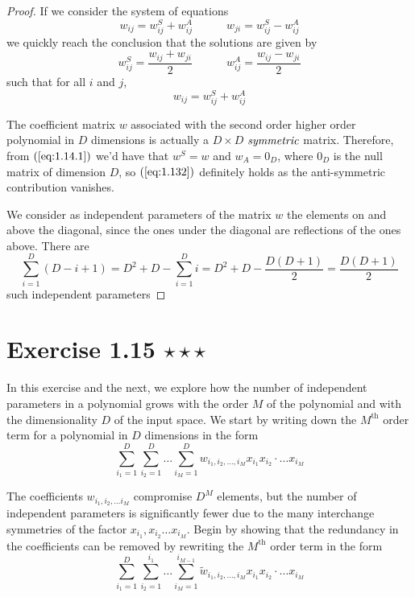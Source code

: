 \vspace{1em}

\begin{proof}
    If we consider the system of equations
    \[
        w_{ij} = w_{ij}^S + w_{ij}^A 
        \hspace{3em}
        w_{ji} = w_{ij}^S - w_{ij}^A
    \]
    we quickly reach the conclusion that the solutions are given by
    \begin{equation*}
        w_{ij}^S = \frac{w_{ij} + w_{ji}}{2}
        \hspace{3em}
        w_{ij}^A = \frac{w_{ij} - w_{ji}}{2}
        \tag{1.14.1}\label{eq:1.14.1}
    \end{equation*}
    such that for all $i$ and $j$, 
    \[
        w_{ij} = w_{ij}^S + w_{ij}^A 
    \] 

    The coefficient matrix $w$ associated with the second order higher order polynomial 
    in $D$ dimensions is actually a $D \times D$ $\emph{symmetric}$ matrix. Therefore, from
    $(\ref{eq:1.14.1})$ we'd have that $w^S = w$ and $w_A = 0_D$, where $0_D$ is the null
    matrix of dimension $D$, so $(\ref{eq:1.132})$ definitely holds as the anti-symmetric
    contribution vanishes.

    We consider as independent parameters of the matrix $w$ the elements on and above the diagonal,
    since the ones under the diagonal are reflections of the ones above. There are  
    \[
        \sum_{i=1}^{D} (D - i + 1) = D^2 + D - \sum_{i=1}^{D} i = D^2 + D - \frac{D(D+1)}{2} = \frac{D(D+1)}{2}
    \] 
    such independent parameters
\end{proof}

\section*{Exercise 1.15 $\star \star \star$}
In this exercise and the next, we explore how the number of independent
parameters in a polynomial grows with the order $M$ of the polynomial and with
the dimensionality $D$ of the input space. We start by writing down the $M^{\text{th}}$ order
term for a polynomial in $D$ dimensions in the form
\begin{equation*}
    \sum_{i_1=1}^{D} \sum_{i_2=1}^{D} \ldots \sum_{i_M=1}^{D} 
        w_{i_1,i_2,\ldots,i_M}x_{i_1}x_{i_2} \cdot \ldots x_{i_M} 
    \tag{1.133}\label{eq:1.133}
\end{equation*}

The coefficients $w_{i_1, i_2, \ldots i_M}$ compromise $D^M$ elements, but the number
of independent parameters is significantly fewer due to the many interchange symmetries
of the factor $x_{i_1}, x_{i_2} \ldots x_{i_M}$. Begin by showing that the redundancy in the
coefficients can be removed by rewriting the $M^\text{th}$ order term in the form
\begin{equation*}
    \sum_{i_1=1}^{D} \sum_{i_2=1}^{i_1} \ldots \sum_{i_M=1}^{i_{M-1}} 
        \widetilde{w}_{i_1,i_2,\ldots,i_M}x_{i_1}x_{i_2} \cdot \ldots x_{i_M} 
    \tag{1.134}\label{eq:1.134}
\end{equation*}

